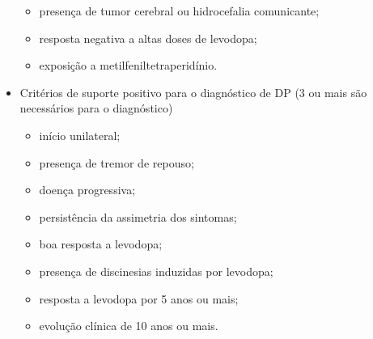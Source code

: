 \begin{itemize}
\begin{itemize}
			\item presença de tumor cerebral ou hidrocefalia comunicante;
			\item resposta negativa a altas doses de levodopa;
			\item exposição a metilfeniltetraperidínio.
		\end{itemize}
	\item Critérios de suporte positivo para o diagnóstico de DP (3 ou mais são necessários para o diagnóstico)
		\begin{itemize}
			\item início unilateral;
			\item presença de tremor de repouso;
			\item doença progressiva;
			\item persistência da assimetria dos sintomas;
			\item boa resposta a levodopa;
			\item presença de discinesias induzidas por levodopa;
			\item resposta a levodopa por 5 anos ou mais;
			\item evolução clínica de 10 anos ou mais.
		\end{itemize}
\end{itemize}